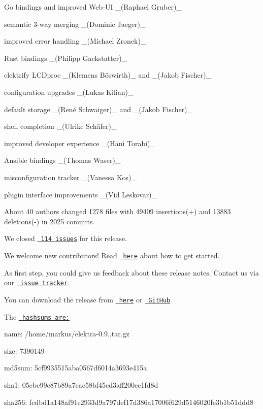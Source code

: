 \begin{DoxyItemize}
\item Go bindings and improved Web-\/\+UI \+\_\+(\+Raphael Gruber)\+\_\+
\item semantic 3-\/way merging \+\_\+(\+Dominic Jaeger)\+\_\+
\item improved error handling \+\_\+(\+Michael Zronek)\+\_\+
\item Rust bindings \+\_\+(\+Philipp Gackstatter)\+\_\+
\item elektrify L\+C\+Dproc \+\_\+(Klemens Böswirth)\+\_\+ and \+\_\+(\+Jakob Fischer)\+\_\+
\item configuration upgrades \+\_\+(\+Lukas Kilian)\+\_\+
\item default storage \+\_\+(René Schwaiger)\+\_\+ and \+\_\+(\+Jakob Fischer)\+\_\+
\item shell completion \+\_\+(Ulrike Schäfer)\+\_\+
\item improved developer experience \+\_\+(\+Hani Torabi)\+\_\+
\item Ansible bindings \+\_\+(\+Thomas Waser)\+\_\+
\item misconfiguration tracker \+\_\+(\+Vanessa Kos)\+\_\+
\item plugin interface improvements \+\_\+(\+Vid Leskovar)\+\_\+
\end{DoxyItemize}

About 40 authors changed 1278 files with 49409 insertions(+) and 13883 deletions(-\/) in 2025 commits.

We closed \href{https://github.com/ElektraInitiative/libelektra/milestone/20?closed=1}{\texttt{ 114 issues}} for this release.

We welcome new contributors! Read \href{https://www.libelektra.org/devgettingstarted/ideas}{\texttt{ here}} about how to get started.

As first step, you could give us feedback about these release notes. Contact us via our \href{https://issues.libelektra.org}{\texttt{ issue tracker}}.

You can download the release from \href{https://www.libelektra.org/ftp/elektra/releases/elektra-0.9.0.tar.gz}{\texttt{ here}} or \href{https://github.com/ElektraInitiative/ftp/blob/master/releases/elektra-0.9.0.tar.gz?raw=true}{\texttt{ Git\+Hub}}

The \href{https://github.com/ElektraInitiative/ftp/blob/master/releases/elektra-0.9.0.tar.gz.hashsum?raw=true}{\texttt{ hashsums are\+:}}


\begin{DoxyItemize}
\item name\+: /home/markus/elektra-\/0.9..\+tar.\+gz
\item size\+: 7390149
\item md5sum\+: 5cf9935515aba0567d6014a3693e415a
\item sha1\+: 05ebe99c87b89a7cac58bf45cd3aff200cc1fd8d
\item sha256\+: fcdbd1a148af91e2933d9a797def17d386a17006f629d5146020fe3b1b51ddd8
\end{DoxyItemize}

